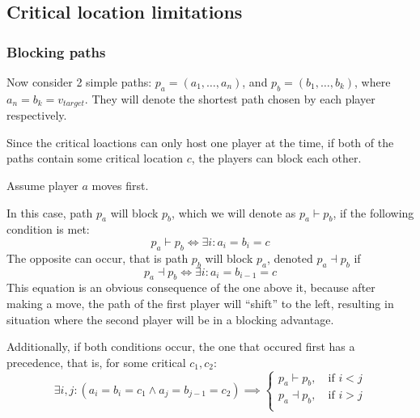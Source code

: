 \documentclass[12pt]{article}
\newcommand*{\target}{\ensuremath{v_{target}}}
\newcommand*{\blocks}{\vdash}
\newcommand*{\blockedBy}{\dashv}
\begin{document}
\subsection{Critical location limitations}

\subsubsection{Blocking paths}

Now consider 2 simple paths: $p_a = (a_1, \ldots, a_n)$, and $p_b = (b_1, \ldots, b_k)$, where $a_n = b_k = \target$.
They will denote the shortest path chosen by each player respectively.

Since the critical loactions can only host one player at the time,
if both of the paths contain some critical location $c$, the players can block each other.

Assume player $a$ moves first.

In this case, path $p_a$ will block $p_b$, which we will denote as $p_a \blocks p_b$, if the following condition is met:
\begin{equation}
    p_a \blocks p_b \iff \exists i : a_i = b_i = c
\end{equation}
The opposite can occur, that is path $p_b$ will block $p_a$, denoted $p_a \blockedBy p_b$ if
\begin{equation}
    p_a \blockedBy p_b \iff \exists i : a_i = b_{i-1} = c
\end{equation}
This equation is an obvious consequence of the one above it, because after making a move, the path of the first player will ``shift'' to the left,
resulting in situation where the second player will be in a blocking advantage.

Additionally, if both conditions occur,
the one that occured first has a precedence,
that is, for some critical $c_1, c_2$:
\begin{equation}
    \exists i,j : (a_i = b_i = c_1 \land a_j = b_{j-1} = c_2) \implies
    \begin{cases}
        p_a \blocks p_b, \quad \text{if $i < j$}    \\
        p_a \blockedBy p_b, \quad \text{if $i > j$} \\
    \end{cases}
\end{equation}
\end{document}
